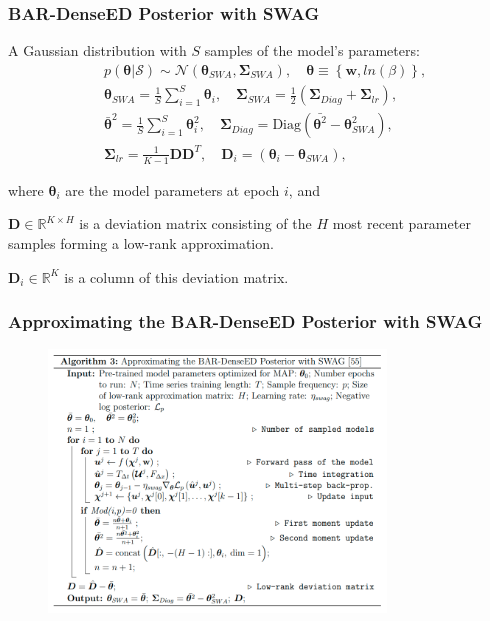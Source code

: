 \documentclass{beamer}
\theoremstyle{remark}
\begin{document}
\begin{frame}
\frametitle{BAR-DenseED Posterior with SWAG}
A Gaussian distribution with $S$ samples of the model's parameters:
\begin{align}
    &p(\bm{\theta}|\mathcal{S}) \sim \mathcal{N}\left(\bm{\theta}_{SWA}, \bm{\Sigma}_{SWA}\right), \quad \bm{\theta} \equiv \left\{\textbf{w}, ln(\beta)\right\},\\
    &\bm{\theta}_{SWA}=\frac{1}{S}\sum_{i=1}^{S}\bm{\theta}_{i}, \quad \bm{\Sigma}_{SWA}=\frac{1}{2}\left(\bm{\Sigma}_{Diag}+\bm{\Sigma}_{lr}\right),\\
    &\bar{\bm{\theta}}^{2}=\frac{1}{S}\sum_{i=1}^{S}\bm{\theta}^{2}_{i}, \quad \bm{\Sigma}_{Diag} = \textrm{Diag}\left(\bar{\bm{\theta}^{2}}-\bm{\theta}_{SWA}^{2}\right),\\
    &\bm{\Sigma}_{lr}=\frac{1}{K-1}\bm{D}\bm{D}^{T}, \quad \bm{D}_{i} = \left(\bm{\theta}_{i}-\bm{\theta}_{SWA}\right),
\end{align}

where $\bm{\theta}_{i}$ are the model parameters at epoch $i$, and 

$\bm{D} \in \mathbb{R}^{K\times H}$ is a deviation matrix consisting of the $H$ most recent parameter samples forming a low-rank approximation.

$\bm{D}_{i} \in \mathbb{R}^{K}$ is a column of this deviation matrix.
\end{frame}

\begin{frame}
\frametitle{Approximating the BAR-DenseED Posterior with SWAG}
\begin{figure}
\includegraphics[width=0.8\textwidth]{./figures/alg3.png}
\end{figure}
\end{frame}
\end{document}

